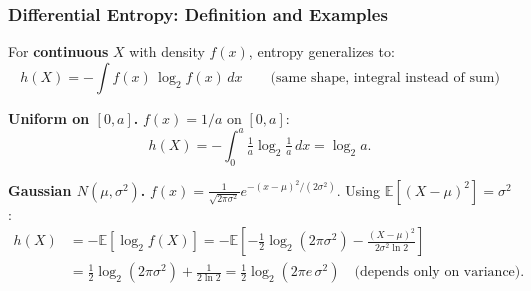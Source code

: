 \documentclass[aspectratio=169]{beamer}
\begin{document}
\begin{frame}
\frametitle{Differential Entropy: Definition and Examples}

\small
For \textbf{continuous} $X$ with density $f(x)$, entropy generalizes to:
$$h(X) = -\int f(x)\,\log_2 f(x)\,dx \qquad\text{(same shape, integral instead of sum)}$$

\vspace{0.05cm}
\textbf{Uniform on $[0, a]$.} \;$f(x) = 1/a$ on $[0, a]$:
\vspace{-0.15cm}
$$h(X) = -\int_0^a \tfrac{1}{a}\log_2\tfrac{1}{a}\,dx = \log_2 a.$$

\vspace{-0.05cm}
\textbf{Gaussian $N(\mu, \sigma^2)$.} \;$f(x) = \frac{1}{\sqrt{2\pi\sigma^2}}e^{-(x-\mu)^2/(2\sigma^2)}$. Using $\mathbb{E}[(X-\mu)^2] = \sigma^2$:
\vspace{-0.1cm}
\begin{align*}
  h(X) &= -\mathbb{E}[\log_2 f(X)] = -\mathbb{E}\!\left[-\tfrac{1}{2}\log_2(2\pi\sigma^2) - \tfrac{(X-\mu)^2}{2\sigma^2 \ln 2}\right]\\[2pt]
       &= \tfrac{1}{2}\log_2(2\pi\sigma^2) + \tfrac{1}{2\ln 2} = \boxed{\tfrac{1}{2}\log_2(2\pi e\,\sigma^2)} \quad\text{(depends only on variance)}.
\end{align*}

\vspace{-0.1cm}
\begin{center}
\end{center}
\end{frame}
\end{document}
